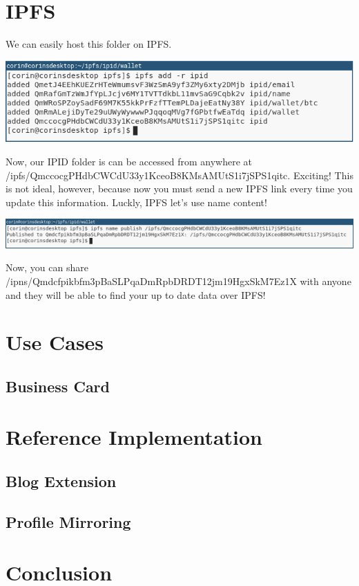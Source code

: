 \documentclass{article}
\begin{document}
\section{IPFS}

We can easily host this folder on IPFS.

\begin{center}
  \includegraphics[width=.9\textwidth]{resources/profile_to_ipfs.png}
\end{center}

Now, our IPID folder is can be accessed from anywhere at \\
  /ipfs/QmccocgPHdbCWCdU33y1KceoB8KMsAMUtS1i7jSPS1qitc. Exciting! 
This is not ideal, however, because now you must send a new IPFS link every time you update this information. Luckly, IPFS let's use name content! 

\begin{center}
  \includegraphics[width=1.2\textwidth]{resources/publish_profile.png}
\end{center}

Now, you can share /ipns/Qmdcfpikbfm3pBaSLPqaDmRpbDRDT12jm19HgxSkM7Ez1X with anyone and they will be able to find your up to date data over IPFS!



\section{Use Cases}

\subsection{Business Card}

\subsection{}

\section{Reference Implementation}

\subsection{Blog Extension}

\subsection{Profile Mirroring}

\section{Conclusion}
\end{document}
